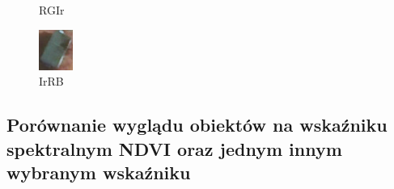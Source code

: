 \documentclass[a4paper,12pt]{article}  %
\begin{document}
\begin{figure}[H]
\begin{minipage}{0.24\textwidth}
        \caption*{RGIr}
    \end{minipage}
    \begin{minipage}{0.24\textwidth}
        \centering
        \includegraphics[width=\linewidth]{spektralne/irrb_budynek3.png}
        \caption*{IrRB}
    \end{minipage}
\end{figure}

\newpage
\subsection{Porównanie wyglądu obiektów na wskaźniku spektralnym NDVI oraz jednym innym wybranym wskaźniku}
\end{document}
